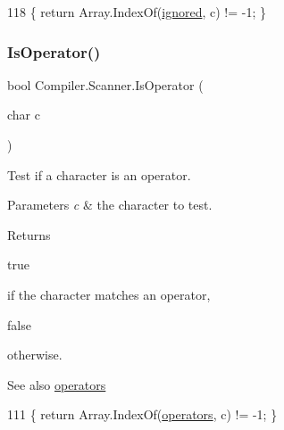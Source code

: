 \begin{DoxyCode}
118 \{ \textcolor{keywordflow}{return} Array.IndexOf(\mbox{\hyperlink{class_compiler_1_1_scanner_afe7355d6751272f7fd901cdd885a1bd1}{ignored}}, c) != -1; \}
\end{DoxyCode}
\mbox{\label{class_compiler_1_1_scanner_afbd70f210f32a803266e042bfe13e58b}} 
\subsubsection{\texorpdfstring{Is\+Operator()}{IsOperator()}}
{\footnotesize\ttfamily bool Compiler.\+Scanner.\+Is\+Operator (\begin{DoxyParamCaption}\item[{char}]{c }\end{DoxyParamCaption})\hspace{0.3cm}{\ttfamily [protected]}}

Test if a character is an operator. 
\begin{DoxyParams}{Parameters}
{\em c} & the character to test. \\
\hline
\end{DoxyParams}
\begin{DoxyReturn}{Returns}

\begin{DoxyCode}
\textcolor{keyword}{true} 
\end{DoxyCode}
 if the character matches an operator,
\begin{DoxyCode}
\textcolor{keyword}{false} 
\end{DoxyCode}
 otherwise. 
\end{DoxyReturn}
\begin{DoxySeeAlso}{See also}
\mbox{\hyperlink{class_compiler_1_1_scanner_a06b412dc474f3c625169dea913ee95da}{operators}} 
\end{DoxySeeAlso}

\begin{DoxyCode}
111 \{ \textcolor{keywordflow}{return} Array.IndexOf(\mbox{\hyperlink{class_compiler_1_1_scanner_a06b412dc474f3c625169dea913ee95da}{operators}}, c) != -1; \}
\end{DoxyCode}
\mbox{\label{class_compiler_1_1_scanner_a60cdf39c3f0fb8d97ca4b635ca2eb0c2}} 
